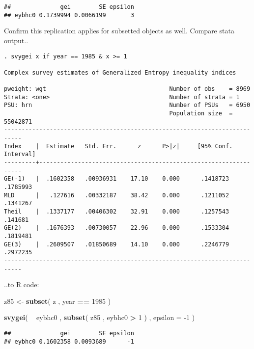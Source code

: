 \documentclass[]{book}
\newenvironment{Shaded}{\begin{snugshade}}{\end{snugshade}}
\newcommand{\DataTypeTok}[1]{\textcolor[rgb]{0.13,0.29,0.53}{#1}}
\newcommand{\DecValTok}[1]{\textcolor[rgb]{0.00,0.00,0.81}{#1}}
\newcommand{\KeywordTok}[1]{\textcolor[rgb]{0.13,0.29,0.53}{\textbf{#1}}}
\newcommand{\NormalTok}[1]{#1}
\newcommand{\OperatorTok}[1]{\textcolor[rgb]{0.81,0.36,0.00}{\textbf{#1}}}
\newcommand{\StringTok}[1]{\textcolor[rgb]{0.31,0.60,0.02}{#1}}
\begin{document}
\begin{verbatim}
##              gei        SE epsilon
## eybhc0 0.1739994 0.0066199       3
\end{verbatim}

Confirm this replication applies for subsetted objects as well. Compare stata output..

\begin{verbatim}
. svygei x if year == 1985 & x >= 1

Complex survey estimates of Generalized Entropy inequality indices
 
pweight: wgt                                   Number of obs    = 8969
Strata: <one>                                  Number of strata = 1
PSU: hrn                                       Number of PSUs   = 6950
                                               Population size  = 55042871
---------------------------------------------------------------------------
Index    |  Estimate   Std. Err.      z      P>|z|     [95% Conf. Interval]
---------+-----------------------------------------------------------------
GE(-1)   |  .1602358   .00936931    17.10    0.000      .1418723   .1785993
MLD      |   .127616   .00332187    38.42    0.000      .1211052   .1341267
Theil    |  .1337177   .00406302    32.91    0.000      .1257543    .141681
GE(2)    |  .1676393   .00730057    22.96    0.000      .1533304   .1819481
GE(3)    |  .2609507   .01850689    14.10    0.000      .2246779   .2972235
---------------------------------------------------------------------------
\end{verbatim}

..to R code:

\begin{Shaded}
\begin{Highlighting}[]
\NormalTok{z85 <-}\StringTok{ }\KeywordTok{subset}\NormalTok{( z , year }\OperatorTok{==}\StringTok{ }\DecValTok{1985}\NormalTok{ )}

\KeywordTok{svygei}\NormalTok{( }\OperatorTok{~}\StringTok{ }\NormalTok{eybhc0 , }\KeywordTok{subset}\NormalTok{( z85 , eybhc0 }\OperatorTok{>}\StringTok{ }\DecValTok{1}\NormalTok{ ) , }\DataTypeTok{epsilon =} \DecValTok{-1}\NormalTok{ )}
\end{Highlighting}
\end{Shaded}

\begin{verbatim}
##              gei        SE epsilon
## eybhc0 0.1602358 0.0093689      -1
\end{verbatim}
\end{document}
